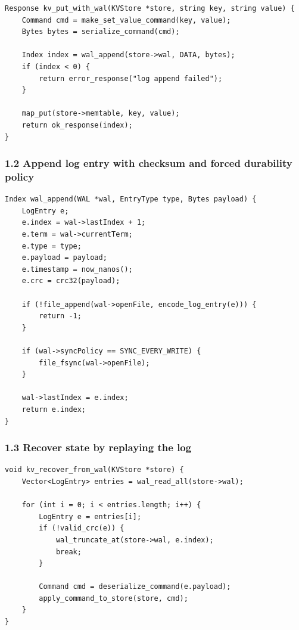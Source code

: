 \documentclass[10pt,letterpaper]{article}
\begin{document}
\begin{verbatim}
Response kv_put_with_wal(KVStore *store, string key, string value) {
    Command cmd = make_set_value_command(key, value);
    Bytes bytes = serialize_command(cmd);

    Index index = wal_append(store->wal, DATA, bytes);
    if (index < 0) {
        return error_response("log append failed");
    }

    map_put(store->memtable, key, value);
    return ok_response(index);
}
\end{verbatim}

\subsubsection*{1.2 Append log entry with checksum and forced durability policy}

\begin{verbatim}
Index wal_append(WAL *wal, EntryType type, Bytes payload) {
    LogEntry e;
    e.index = wal->lastIndex + 1;
    e.term = wal->currentTerm;
    e.type = type;
    e.payload = payload;
    e.timestamp = now_nanos();
    e.crc = crc32(payload);

    if (!file_append(wal->openFile, encode_log_entry(e))) {
        return -1;
    }

    if (wal->syncPolicy == SYNC_EVERY_WRITE) {
        file_fsync(wal->openFile);
    }

    wal->lastIndex = e.index;
    return e.index;
}
\end{verbatim}

\subsubsection*{1.3 Recover state by replaying the log}

\begin{verbatim}
void kv_recover_from_wal(KVStore *store) {
    Vector<LogEntry> entries = wal_read_all(store->wal);

    for (int i = 0; i < entries.length; i++) {
        LogEntry e = entries[i];
        if (!valid_crc(e)) {
            wal_truncate_at(store->wal, e.index);
            break;
        }

        Command cmd = deserialize_command(e.payload);
        apply_command_to_store(store, cmd);
    }
}
\end{verbatim}
\end{document}
